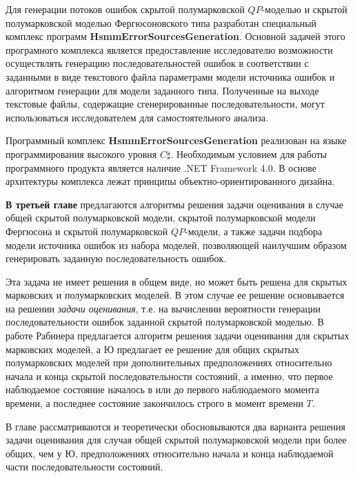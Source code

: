 \documentclass[twoside,12pt]{article}
\begin{document}
Для генерации потоков ошибок скрытой полумарковской $QP$-моделью и скрытой полумарковской моделью Фергюсоновского типа разработан специальный комплекс программ \textbf{HsmmErrorSourcesGeneration}. Основной задачей этого програмного комплекса является предоставление исследователю возможности осуществлять генерацию последовательностей ошибок в соответствии с заданными в виде текстового файла параметрами модели источника ошибок и алгоритмом генерации для модели заданного типа. Полученные на выходе текстовые файлы, содержащие сгенерированные последовательности, могут использоваться исследователем для самостоятельного анализа.

Программный комплекс \textbf{HsmmErrorSourcesGeneration} реализован на языке программирования высокого уровня $C\sharp$. Необходимым условием для работы программного продукта является наличие .NET Framework 4.0. В основе архитектуры комплекса лежат принципы объектно-ориентированного дизайна.

\textbf{В третьей главе} предлагаются алгоритмы решения задачи оценивания в случае общей скрытой полумарковской модели, скрытой полумарковской модели Фергюсона и скрытой полумарковской $QP$-модели, а также задачи подбора модели источника ошибок из набора моделей, позволяющей наилучшим образом генерировать заданную последовательность ошибок.

Эта задача не имеет решения в общем виде, но может быть решена для скрытых марковских и полумарковских моделей. В этом случае ее решение основывается на решении \textit{задачи оценивания}, т.е. на вычислении вероятности генерации последовательности ошибок заданной скрытой полумарковской моделью. В работе Рабинера предлагается алгоритм решения задачи оценивания для скрытых марковских моделей, а Ю предлагает ее решение для общих скрытых полумарковских моделей при дополнительных предположениях относительно начала и конца скрытой последовательности состояний, а именно, что первое наблюдаемое состояние началось в или до первого наблюдаемого момента времени, а последнее состояние закончилось строго в момент времени $T$.

В главе рассматриваются и теоретически обосновываются два варианта решения задачи оценивания для случая общей скрытой полумарковской модели при более общих, чем у Ю, предположениях относительно начала и конца наблюдаемой части последовательности состояний.
\end{document}
